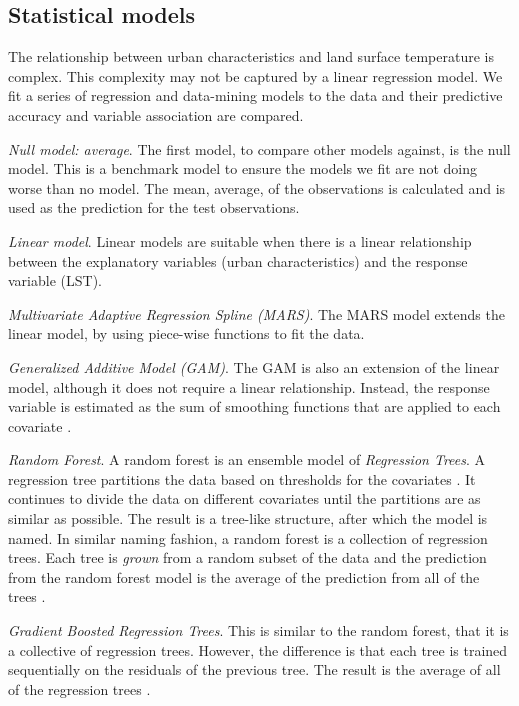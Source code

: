 \documentclass[final,3p,times,twocolumn,sort&compress]{elsarticle}
\begin{document}
\subsection{Statistical models}
\label{ss:models}
The relationship between urban characteristics and land surface temperature is complex.
This complexity may not be captured by a linear regression model. 
We fit a series of regression and data-mining models to the data and their predictive accuracy and variable association are compared.

\textit{Null model: average}. The first model, to compare other models against, is the null model. 
This is a benchmark model to ensure the models we fit are not doing worse than no model.
The mean, average, of the observations is calculated and is used as the prediction for the test observations.

\textit{Linear model}. Linear models are suitable when there is a linear relationship between the explanatory variables (urban characteristics) and the response variable (LST).

\textit{Multivariate Adaptive Regression Spline (MARS)}. The MARS model extends the linear model, by using piece-wise functions to fit the data. \cite{Friedman1991-of}

\textit{Generalized Additive Model (GAM)}. The GAM is also an extension of the linear model, although it does not require a linear relationship. Instead, the response variable is estimated as the sum of smoothing functions that are applied to each covariate \cite{Hastie1990-cg}.

\textit{Random Forest}. A random forest is an ensemble model of \textit{Regression Trees}. A regression tree partitions the data based on thresholds for the covariates \cite{Breiman1984-hw}. It continues to divide the data on different covariates until the partitions are as similar as possible. 
The result is a tree-like structure, after which the model is named.
In similar naming fashion, a random forest is a collection of regression trees.
Each tree is \textit{grown} from a random subset of the data and the prediction from the random forest model is the average of the prediction from all of the trees \cite{Breiman2001-rt}.

\textit{Gradient Boosted Regression Trees}. This is similar to the random forest, that it is a collective of regression trees. 
However, the difference is that each tree is trained sequentially on the residuals of the previous tree.
The result is the average of all of the regression trees \cite{Geron2017-ek}.
\end{document}
